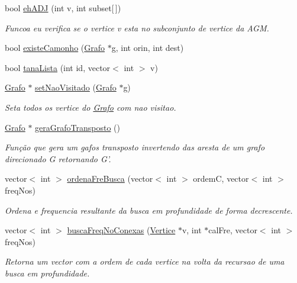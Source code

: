 \begin{DoxyCompactItemize}
bool \hyperlink{class_grafo_aa5d199d9e3c9c0b7cb12fb369945e066}{eh\-A\-D\-J} (int v, int subset\mbox{[}$\,$\mbox{]})
\begin{DoxyCompactList}\small\item\em Funcoa eu verifica se o vertice v esta no subconjunto de vertice da A\-G\-M. \end{DoxyCompactList}\item 
bool \hyperlink{class_grafo_a2772417b97b45251166e8dd1e7189966}{existe\-Camonho} (\hyperlink{class_grafo}{Grafo} $\ast$g, int orin, int dest)
\item 
bool \hyperlink{class_grafo_a05bbf393596f80289b5794c98221e73a}{tana\-Lista} (int id, vector$<$ int $>$ v)
\item 
\hyperlink{class_grafo}{Grafo} $\ast$ \hyperlink{class_grafo_a4cee5922bd84c2652ad31383a61f487b}{set\-Nao\-Visitado} (\hyperlink{class_grafo}{Grafo} $\ast$g)
\begin{DoxyCompactList}\small\item\em Seta todos os vertice do \hyperlink{class_grafo}{Grafo} com nao visitao. \end{DoxyCompactList}\item 
\hyperlink{class_grafo}{Grafo} $\ast$ \hyperlink{class_grafo_a363d5b79f8ab7aaa27dea38387e9ffb6}{gera\-Grafo\-Transposto} ()
\begin{DoxyCompactList}\small\item\em Função que gera um gafos transposto invertendo das aresta de um grafo direcionado G retornando G'. \end{DoxyCompactList}\item 
vector$<$ int $>$ \hyperlink{class_grafo_a61f6a9940df187006f5c445c6d6f1aec}{ordena\-Fre\-Busca} (vector$<$ int $>$ ordem\-C, vector$<$ int $>$freq\-Nos)
\begin{DoxyCompactList}\small\item\em Ordena e frequencia resultante da busca em profundidade de forma decrescente. \end{DoxyCompactList}\item 
vector$<$ int $>$ \hyperlink{class_grafo_acd84b6964f6c1fb550a86e9d5b85fd4a}{busca\-Freq\-No\-Conexas} (\hyperlink{class_vertice}{Vertice} $\ast$v, int $\ast$cal\-Fre, vector$<$ int $>$ freq\-Nos)
\begin{DoxyCompactList}\small\item\em Retorna um vector com a ordem de cada vertice na volta da recursao de uma busca em profundidade. \end{DoxyCompactList}\item 

\end{DoxyCompactItemize}
